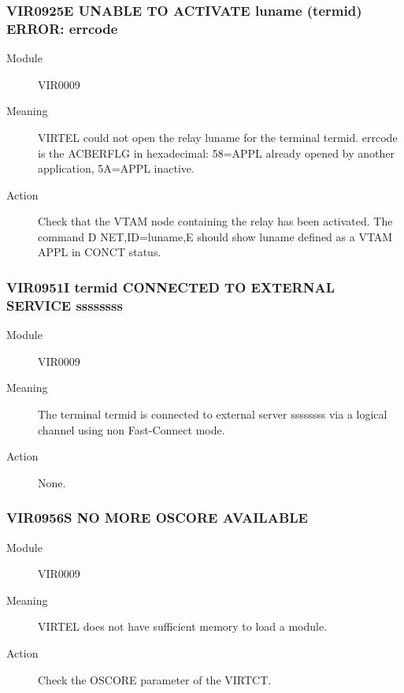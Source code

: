 \documentclass[letterpaper,10pt,english]{sphinxmanual}
\begin{document}
\subsubsection{VIR0925E UNABLE TO ACTIVATE luname (termid) ERROR: errcode}
\label{\detokenize{messages:vir0925e-unable-to-activate-luname-termid-error-errcode}}\begin{description}
\item[{Module}] \leavevmode
VIR0009

\item[{Meaning}] \leavevmode
VIRTEL could not open the relay luname for the terminal termid. errcode is the ACBERFLG in hexadecimal: 58=APPL already opened by another application, 5A=APPL inactive.

\item[{Action}] \leavevmode
Check that the VTAM node containing the relay has been activated. The command D NET,ID=luname,E should show luname defined as a VTAM APPL in CONCT status.

\end{description}


\subsubsection{VIR0951I termid CONNECTED TO EXTERNAL SERVICE ssssssss}
\label{\detokenize{messages:vir0951i-termid-connected-to-external-service-ssssssss}}\begin{description}
\item[{Module}] \leavevmode
VIR0009

\item[{Meaning}] \leavevmode
The terminal termid is connected to external server ssssssss via a logical channel using non Fast-Connect mode.

\item[{Action}] \leavevmode
None.

\end{description}


\subsubsection{VIR0956S NO MORE OSCORE AVAILABLE}
\label{\detokenize{messages:vir0956s-no-more-oscore-available}}\begin{description}
\item[{Module}] \leavevmode
VIR0009

\item[{Meaning}] \leavevmode
VIRTEL does not have sufficient memory to load a module.

\item[{Action}] \leavevmode
Check the OSCORE parameter of the VIRTCT.

\end{description}
\end{document}
